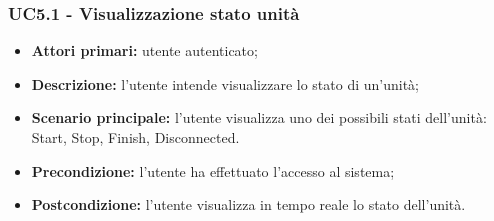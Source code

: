 \subsubsection{UC5.1 - Visualizzazione stato unità}
\begin{itemize}
    \item \textbf{Attori primari:} utente autenticato;
    \item \textbf{Descrizione:} l'utente intende visualizzare lo stato di un'unità;
    \item \textbf{Scenario principale:} l'utente visualizza uno dei possibili stati dell'unità: Start, Stop, Finish, Disconnected.
    \item \textbf{Precondizione:} l'utente ha effettuato l'accesso al sistema;
    \item \textbf{Postcondizione:} l'utente visualizza in tempo reale lo stato dell'unità.
\end{itemize}

